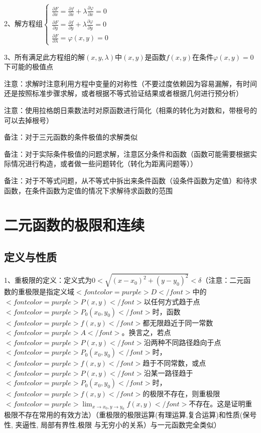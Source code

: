 2、解方程组$ \left\{\begin{array}{l} \frac{\partial F}{\partial x}=\frac{\partial f}{\partial x}+\lambda \frac{\partial \varphi}{\partial x}=0 \\ \frac{\partial F}{\partial y}=\frac{\partial f}{\partial y}+\lambda \frac{\partial \varphi}{\partial y}=0 \\ \frac{\partial F}{\partial \lambda}=\varphi(x, y)=0 \end{array}\right. $

3、所有满足此方程组的解$ (x, y, \lambda) $中$ (x, y) $是函数$ f(x, y) $在条件$ \varphi(x, y)=0 $下可能的极值点

注意：求解时注意利用方程中变量的对称性（不要过度依赖因为容易漏解，有时间还是按照标准步骤求解，或者根据不等式验证结果或者根据几何进行预分析）

注意：使用拉格朗日乘数法时对原函数进行简化（相乘的转化为对数和，带根号的可以去掉根号）

备注：对于三元函数的条件极值的求解类似

备注：对于实际条件极值的问题求解，注意区分条件和函数（函数可能需要根据实际情况进行构造，或者做一些问题转化（转化为距离问题等））

备注：对于不等式问题，从不等式中拆出来条件函数（设条件函数为定值）和待求函数，在条件函数为定值的情况下求解待求函数的范围



\section{二元函数的极限和连续}



\subsection{定义与性质}

1、重极限的定义：定义式为$ 0<\sqrt{\left(x-x_{0}\right)^{2}+\left(y-y_{0}\right)^{2}}<\delta $（注意：二元函数的重极限是指定义域$ <font color=purple>D</font> $中的$ <font color=purple>P(x, y)</font> $以任何方式趋于点$ <font color=purple>P_{0}\left(x_{0}, y_{0}\right)</font> $时，函数$ <font color=purple>f(x, y)</font> $都无限趋近于同一常数$ <font color=purple>A</font> $。换言之，若点$ <font color=purple>P(x, y)</font> $沿两种不同路径趋向于点$ <font color=purple>P_{0}\left(x_{0}, y_{0}\right)</font> $时，$ <font color=purple>f(x, y)</font> $趋于不同常数，或点$ <font color=purple>P(x, y)</font> $沿某一路径趋于$ <font color=purple>P_{0}\left(x_{0}, y_{0}\right)</font> $时，$ <font color=purple>f(x, y)</font> $的极限不存在，则重极限$ <font color=purple>\lim_{x \rightarrow x_{0},y \rightarrow y_{0}} f(x, y)</font> $不存在。这是证明重极限不存在常用的有效方法）（重极限的极限运算(有理运算,复合运算)和性质(保号性, 夹逼性, 局部有界性,极限 与无穷小的关系）与一元函数完全类似）


